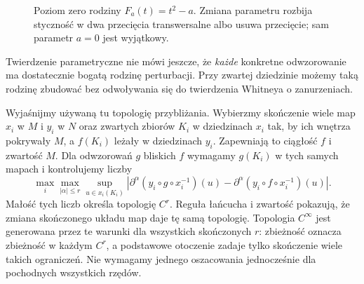 \begin{figure}[H]
\centering
{}
\caption{Poziom zero rodziny $F_a(t)=t^2-a$.
Zmiana parametru rozbija styczność w dwa
przecięcia transwersalne albo usuwa przecięcie;
sam parametr $a=0$ jest wyjątkowy.}
\label{fig:transwersalnosc-perturbacja}
\end{figure}

Twierdzenie parametryczne nie mówi jeszcze, że
\emph{każde} konkretne odwzorowanie ma dostatecznie
bogatą rodzinę perturbacji. Przy zwartej dziedzinie
możemy taką rodzinę zbudować bez odwoływania się
do twierdzenia Whitneya o zanurzeniach.

Wyjaśnijmy używaną tu topologię przybliżania. Wybierzmy
skończenie wiele map $x_i$ w $M$ i $y_i$ w $N$ oraz
zwartych zbiorów $K_i$ w dziedzinach $x_i$ tak, by ich
wnętrza pokrywały $M$, a $f(K_i)$ leżały w dziedzinach $y_i$.
Zapewniają to ciągłość $f$ i zwartość $M$.
Dla odwzorowań $g$ bliskich $f$ wymagamy
$g(K_i)$ w tych samych mapach i kontrolujemy liczby
\[
 \max_i\max_{|\alpha|\leq r}\sup_{u\in x_i(K_i)}
 \left|\partial^\alpha(y_i\circ g\circ x_i^{-1})(u)
       -\partial^\alpha(y_i\circ f\circ x_i^{-1})(u)\right|.
\]
Małość tych liczb określa topologię $C^r$. Reguła łańcucha
i zwartość pokazują, że zmiana skończonego układu map
daje tę samą topologię. Topologia $C^\infty$ jest generowana
przez te warunki dla wszystkich skończonych $r$:
zbieżność oznacza zbieżność w każdym $C^r$, a podstawowe
otoczenie zadaje tylko skończenie wiele takich ograniczeń.
Nie wymagamy jednego oszacowania jednocześnie dla
pochodnych wszystkich rzędów.


